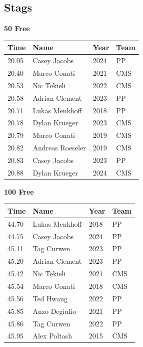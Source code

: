 \subsection{Stags}
\vspace{1.2em}
\noindent\begin{minipage}[t]{0.98\textwidth}
\centering
\textbf{\textcolor{teamprimary}{50 Free}}\par
\vspace{0.5em}
\centering
\small
\renewcommand{\arraystretch}{1.0}
\setlength{\tabcolsep}{4pt}
\begin{tabular}{@{}p{2.5cm}p{4.5cm}p{1.5cm}p{2.5cm}@{}}
\toprule
\textbf{Time} & \textbf{Name} & \textbf{Year} & \textbf{Team} \\
\midrule
20.05 & Casey Jacobs & 2024 & PP \\
20.40 & Marco Conati & 2021 & CMS \\
20.53 & Nic Tekieli & 2022 & CMS \\
20.58 & Adrian Clement & 2023 & PP \\
20.71 & Lukas Menkhoff & 2018 & PP \\
20.78 & Dylan Krueger & 2023 & CMS \\
20.79 & Marco Conati & 2019 & CMS \\
20.82 & Andreas Roeseler & 2019 & CMS \\
20.83 & Casey Jacobs & 2023 & PP \\
20.88 & Dylan Krueger & 2024 & CMS \\
\bottomrule
\end{tabular}
\end{minipage}
\vspace{1.2em}
\noindent\begin{minipage}[t]{0.98\textwidth}
\centering
\textbf{\textcolor{teamprimary}{100 Free}}\par
\vspace{0.5em}
\centering
\small
\renewcommand{\arraystretch}{1.0}
\setlength{\tabcolsep}{4pt}
\begin{tabular}{@{}p{2.5cm}p{4.5cm}p{1.5cm}p{2.5cm}@{}}
\toprule
\textbf{Time} & \textbf{Name} & \textbf{Year} & \textbf{Team} \\
\midrule
44.70 & Lukas Menkhoff & 2018 & PP \\
44.75 & Casey Jacobs & 2024 & PP \\
45.11 & Tag Curwen & 2023 & PP \\
45.20 & Adrian Clement & 2023 & PP \\
45.42 & Nic Tekieli & 2021 & CMS \\
45.54 & Marco Conati & 2018 & CMS \\
45.56 & Ted Hwang & 2022 & PP \\
45.85 & Anzo Degiulio & 2021 & PP \\
45.86 & Tag Curwen & 2022 & PP \\
45.95 & Alex Poltash & 2015 & CMS \\
\bottomrule
\end{tabular}
\end{minipage}
